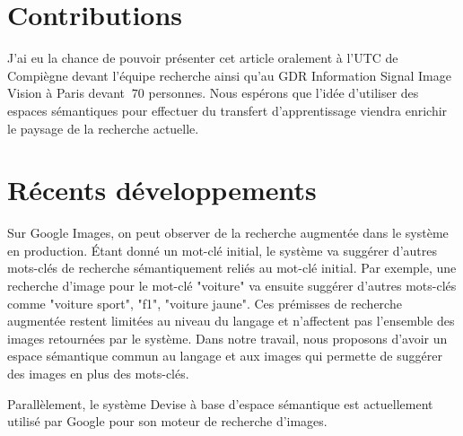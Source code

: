 \section{Contributions}

J'ai eu la chance de pouvoir présenter cet article oralement à l'UTC de
Compiègne devant l'équipe recherche ainsi qu'au GDR Information Signal Image
Vision à Paris devant $~70$ personnes. Nous espérons que l'idée d'utiliser des
espaces sémantiques pour effectuer du transfert d'apprentissage viendra
enrichir le paysage de la recherche actuelle.

\section{R\'{e}cents d\'{e}veloppements}

Sur Google Images, on peut observer de la recherche augmentée dans le système
en production. Étant donné un mot-clé initial, le système va suggérer d'autres
mots-clés de recherche sémantiquement reliés au mot-clé initial. Par exemple,
une recherche d'image pour le mot-clé "voiture" va ensuite suggérer d'autres
mots-clés comme "voiture sport", "f1", "voiture jaune". Ces prémisses de
recherche augmentée restent limitées au niveau du langage et n'affectent pas
l'ensemble des images retournées par le système. Dans notre travail, nous
proposons d'avoir un espace sémantique commun au langage et aux images qui
permette de suggérer des images en plus des mots-clés.  

Parallèlement, le système Devise \citep{samy-extreme} à base d'espace
sémantique est actuellement utilisé par Google pour son moteur de recherche
d'images.

